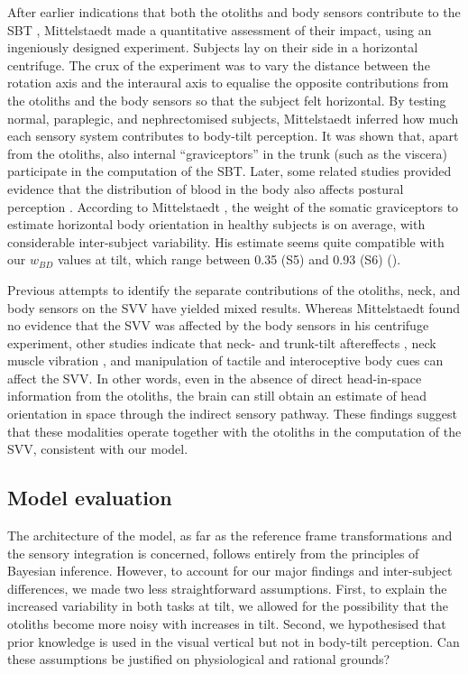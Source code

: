 After earlier indications that both the otoliths and body sensors contribute to the SBT \cite{clark1963, clark1964, nelson1968}, Mittelstaedt \citeyear{mittelstaedt1997} made a quantitative assessment of their impact, using an ingeniously designed experiment. Subjects lay on their side in a horizontal centrifuge. The crux of the experiment was to vary the distance between the rotation axis and the interaural axis to equalise the opposite contributions from the otoliths and the body sensors so that the subject felt horizontal. By testing normal, paraplegic, and nephrectomised subjects, Mittelstaedt inferred how much each sensory system contributes to body-tilt perception. It was shown that, apart from the otoliths, also internal ``graviceptors'' in the trunk (such as the viscera) participate in the computation of the SBT. Later, some related studies provided evidence that the distribution of blood in the body also affects postural perception \cite{vaitl1997, vaitl2002}. According to Mittelstaedt \citeyear{mittelstaedt1998}, the weight of the somatic graviceptors to estimate horizontal body orientation in healthy subjects is  on average, with considerable inter-subject variability. His estimate seems quite compatible with our $w_{BD}$ values at  tilt, which range between 0.35 (S5) and 0.93 (S6) (). 

Previous attempts to identify the separate contributions of the otoliths, neck, and body sensors on the SVV have yielded mixed results. Whereas Mittelstaedt \citeyear{mittelstaedt1998} found no evidence that the SVV was affected by the body sensors in his centrifuge experiment, other studies indicate that neck- and trunk-tilt aftereffects \cite{wade1968}, neck muscle vibration \cite{mckenna2004}, and manipulation of tactile and interoceptive body cues \cite{trousselard2004} can affect the SVV. In other words, even in the absence of direct head-in-space information from the otoliths, the brain can still obtain an estimate of head orientation in space through the indirect sensory pathway. These findings suggest that these modalities operate together with the otoliths in the computation of the SVV, consistent with our model. 


\subsection{Model evaluation}
 
The architecture of the model, as far as the reference frame transformations and the sensory integration is concerned, follows entirely from the principles of Bayesian inference. However, to account for our major findings and inter-subject differences, we made two less straightforward assumptions. First, to explain the increased variability in both tasks at  tilt, we allowed for the possibility that the otoliths become more noisy with increases in tilt. Second, we hypothesised that prior knowledge is used in the visual vertical but not in body-tilt perception. Can these assumptions be justified on physiological and rational grounds? 

